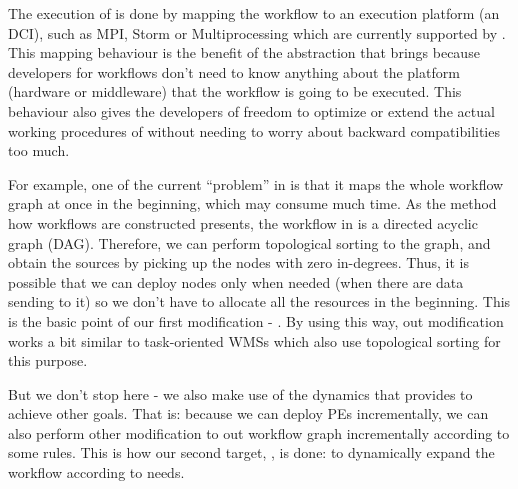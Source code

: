 The execution of \dpy is done by mapping the workflow to an execution platform (\ie an DCI), such as MPI, Storm or Multiprocessing which are currently supported by \dpy. This mapping behaviour is the benefit of the abstraction that \dpy brings because developers for workflows don't need to know anything about the platform (\eg hardware or middleware) that the workflow is going to be executed. This behaviour also gives the developers of \dpy freedom to optimize or extend the actual working procedures of \dpy without needing to worry about backward compatibilities too much.

For example, one of the current ``problem'' in \dpy is that it maps the whole workflow graph at once in the beginning, which may consume much time. As the method how workflows are constructed presents, the workflow in \dpy is a directed acyclic graph (DAG). Therefore, we can perform topological sorting to the graph, and obtain the sources by picking up the nodes with zero in-degrees. Thus, it is possible that we can deploy nodes only when needed (\eg when there are data sending to it) so we don't have to allocate all the resources in the beginning. This is the basic point of our first modification - \tincdep. By using this way, out modification works a bit similar to task-oriented WMSs which also use topological sorting for this purpose.

But we don't stop here - we also make use of the dynamics that \tincdep provides to achieve other goals. That is: because we can deploy PEs incrementally, we can also perform other modification to out workflow graph incrementally according to some rules. This is how our second target, \tdynexp, is done: to dynamically expand the workflow according to needs.

